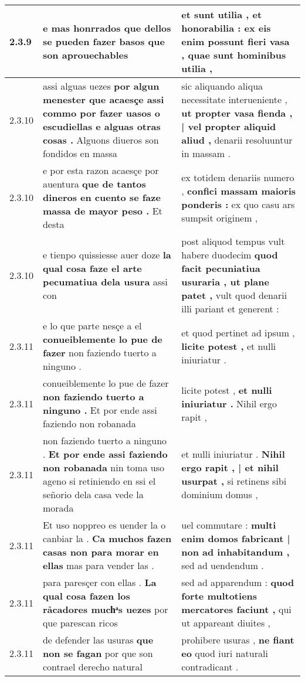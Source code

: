 \begin{tabular}{|p{1cm}|p{6.5cm}|p{6.5cm}|}
2.3.9 & e mas honrrados \textbf{ que dellos se pueden fazer basos } que son aprouechables & et sunt utilia , et honorabilia : \textbf{ ex eis enim possunt fieri vasa , } quae sunt hominibus utilia , \\\hline
2.3.10 & assi alguas uezes \textbf{ por algun menester que acaesçe assi commo por fazer uasos o escudiellas e alguas otras cosas . } Alguons diueros son fondidos en massa & sic aliquando aliqua necessitate interueniente , \textbf{ ut propter vasa fienda , | vel propter aliquid aliud , } denarii resoluuntur in massam . \\\hline
2.3.10 & e por esta razon acaesçe por auentura \textbf{ que de tantos dineros en cuento se faze massa de mayor peso . } Et desta & ex totidem denariis numero , \textbf{ confici massam maioris ponderis : } ex quo casu ars sumpsit originem , \\\hline
2.3.10 & e tienpo quissiesse auer doze \textbf{ la qual cosa faze el arte pecumatiua dela usura } assi con & post aliquod tempus vult habere duodecim \textbf{ quod facit pecuniatiua usuraria , ut plane patet , } vult quod denarii illi pariant et generent : \\\hline
2.3.11 & e lo que parte nesçe a el \textbf{ conueiblemente lo pue de fazer } non faziendo tuerto a ninguno . & et quod pertinet ad ipsum , \textbf{ licite potest , } et nulli iniuriatur . \\\hline
2.3.11 & conueiblemente lo pue de fazer \textbf{ non faziendo tuerto a ninguno . } Et por ende assi faziendo non robanada & licite potest , \textbf{ et nulli iniuriatur . } Nihil ergo rapit , \\\hline
2.3.11 & non faziendo tuerto a ninguno . \textbf{ Et por ende assi faziendo non robanada } nin toma uso ageno si retiniendo en ssi el señorio dela casa vede la morada & et nulli iniuriatur . \textbf{ Nihil ergo rapit , | et nihil usurpat , } si retinens sibi dominium domus , \\\hline
2.3.11 & Et uso noppreo es uender la o canbiar la . \textbf{ Ca muchos fazen casas non para morar en ellas } mas para vender las . & uel commutare : \textbf{ multi enim domos fabricant | non ad inhabitandum , } sed ad uendendum . \\\hline
2.3.11 & para paresçer con ellas . \textbf{ La qual cosa fazen los rảcadores muchͣs uezes } por que parescan ricos & sed ad apparendum : \textbf{ quod forte multotiens mercatores faciunt , } qui ut appareant diuites , \\\hline
2.3.11 & de defender las usuras \textbf{ que non se fagan } por que son contrael derecho natural & prohibere usuras , \textbf{ ne fiant eo } quod iuri naturali contradicant . \\\hline

\end{tabular}
